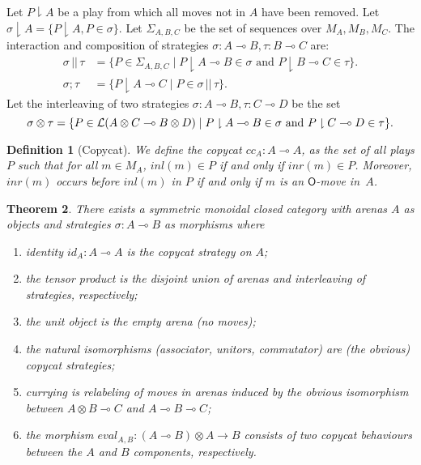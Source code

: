 \documentclass{article}
\newtheorem{theorem}{Theorem}
\newtheorem{definition}[theorem]{Definition}
\newcommand{\mv}[1]{\mathsf{#1}}
\newcommand{\keep}{\downharpoonright}
\begin{document}
Let $P\keep A$ be a play from which all moves not in $A$ have been removed. Let $\sigma\keep A=\{P\keep A, P\in \sigma\}$. Let $\Sigma_{A,B,C}$ be the set of sequences over $M_A, M_B, M_C$. The interaction and composition of  strategies $\sigma:A\multimap B, \tau:B \multimap C$ are:
\begin{align*}
\sigma\,||\,\tau&=\{ P\in\Sigma_{A,B,C} \mid  P \keep A\multimap B\in\sigma\text{ and } P\keep B\multimap C\in \tau \}.
\\
\sigma;\tau &= \{ P\keep A\multimap C\mid P\in \sigma\,||\,\tau\}.
\end{align*}
Let the interleaving of two strategies $\sigma:A\multimap B, \tau:C\multimap D$ be the set
\[
\sigma\otimes\tau=\{ P\in\mathcal L(A\otimes C\multimap B\otimes D) \mid \\ P \keep A\multimap B\in\sigma\text{ and } P\keep C\multimap D\in \tau \}.
\]




\newcommand{\copycat}{c\!c}
\begin{definition}[Copycat]\label{def:cc}
  We define the \emph{copycat} 
  ${\copycat}_A:A\multimap A$, as the set of all
  plays $P$ such that for all $m\in M_A$,
  $\mathit{inl}(m)\in P$ if and only if $\mathit{inr}(m)\in P$. Moreover, 
  $\mathit{inr}(m)$ occurs before $\mathit{inl}(m)$ in $P$ if and only if $m$ is an $\mv O$-move in~$A$.
\end{definition}

\begin{theorem}\label{thm:games}
There exists a symmetric monoidal closed category with arenas $A$ as objects and strategies $\sigma: A\multimap B$ as morphisms where
\begin{enumerate}
\item identity $id_A:A \multimap A$ is the copycat strategy on $A$;
\item the tensor product is the disjoint union of arenas and interleaving of strategies, respectively;
\item the unit object is the empty arena (no moves);
\item the natural isomorphisms (associator, unitors, commutator) are (the obvious) copycat strategies;
\item currying is relabeling of moves in arenas induced by the obvious isomorphism between $A\otimes B\multimap C$ and $A\multimap B\multimap C$;
\item the morphism $eval_{A,B}:(A\multimap B)\otimes A\rightarrow B$ consists of two copycat behaviours between the $A$ and $B$ components, respectively.
\end{enumerate}
\end{theorem}
\end{document}
